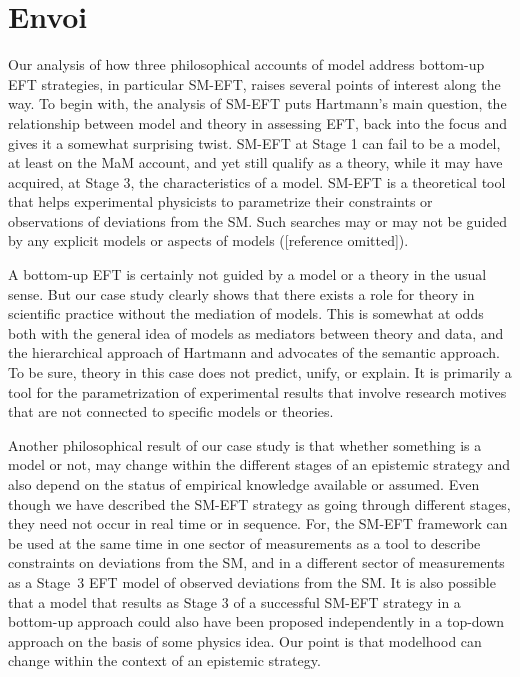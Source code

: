 \section{Envoi}

Our analysis of how three philosophical accounts of model address bottom-up EFT strategies, in particular SM-EFT, raises several points of interest along the way.
To begin with, the analysis of SM-EFT puts Hartmann's main question, the relationship between model and theory in assessing EFT, back into the focus and gives it a somewhat surprising twist.
SM-EFT at Stage 1 can fail to be a model, at least on the MaM account, and yet still qualify as a theory, while it may have acquired, at Stage 3, the characteristics of a model.
SM-EFT is a theoretical tool that helps experimental physicists to parametrize their constraints or observations of deviations from the SM. 
Such searches may or may not be guided by any explicit models or aspects of models ([reference omitted]).

A bottom-up EFT is certainly not guided by a model or a theory in the usual sense. But our case study clearly shows that there exists a role for theory in scientific practice without the mediation of models. 
This is somewhat at odds both with the general idea of models as mediators between theory and data, and the hierarchical approach of Hartmann and advocates of the semantic approach. 
To be sure, theory in this case does not predict, unify, or explain. 
It is primarily a tool for the parametrization of experimental results that involve research motives that are not connected to specific models or theories.


Another philosophical result of our case study is that whether something is a model or not, may change within the different stages of an epistemic strategy and also depend on the status of empirical knowledge available or assumed.
Even though we have described the SM-EFT strategy as going through different stages, they need not occur in real time or in sequence. For, the SM-EFT framework can be used at the same time in one sector of measurements as a tool to describe constraints on deviations from the SM, and in a different sector of measurements as a Stage~3 EFT model of observed deviations from the SM.
It is also possible that a model that results as Stage 3 of a successful SM-EFT strategy in a bottom-up approach could also have been proposed independently in a top-down approach on the basis of some physics idea. Our point is that modelhood can change within the context of an epistemic strategy.


